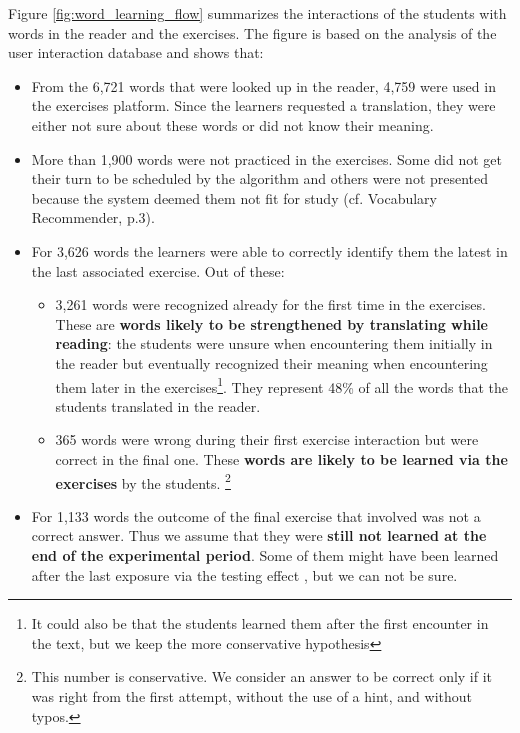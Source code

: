   Figure \ref{fig:word_learning_flow} summarizes the interactions of the students with words in the reader and the exercises. The figure is based on the analysis of the user interaction database and shows that: 

  \begin{itemize}
    \item From the 6,721 words that were looked up in the reader, 4,759 were used in the exercises platform. Since the learners requested a translation, they were either not sure about these words or did not know their meaning.

    \item More than 1,900 words were not practiced in the exercises. 
    Some did not get their turn to be scheduled by the algorithm and others were not presented because the system deemed them not fit for study (cf. Vocabulary Recommender, p.3). 

    \item For 3,626 words 
    the learners were able to correctly identify them the latest in the last associated exercise. Out of these: 

    \begin{itemize}
      \item 3,261 words 
      were recognized already for the first time in the exercises. These are {\bf words likely to be strengthened by translating while reading}: the students were unsure when encountering them initially in the reader but eventually recognized their meaning when encountering them later in the exercises\footnote{It could also be that the students learned them after the first encounter in the text, but we keep the more conservative hypothesis}.  They represent 48\% of all the words that the students translated in the reader.

      \item 365 words 
      were wrong during their first exercise interaction but were correct in the final one. These {\bf words are likely to be learned via the exercises} by the students. \footnote{This number is conservative. We consider an answer to be correct only if it was right from the first attempt, without the use of a hint, and without typos.}

    \end{itemize}

  \item For 1,133 words 
  the outcome of the final exercise that involved was not a correct answer. Thus we assume that they were {\bf still not learned at the end of the experimental period}. Some of them might have been learned after the last exposure via the testing effect \cite{Roediger11-TestingEffect}, but we can not be sure.

  \end{itemize}

